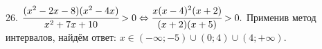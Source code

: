 26. $\cfrac{(x^2-2x-8)(x^2-4x)}{x^2+7x+10}>0\Leftrightarrow\cfrac{x(x-4)^2(x+2)}{(x+2)(x+5)}>0.$ Применив метод интервалов, найдём ответ: $x\in
(-\infty;-5)\cup(0;4)\cup(4;+\infty).$
\begin{figure}[ht!]
\end{figure}\\
